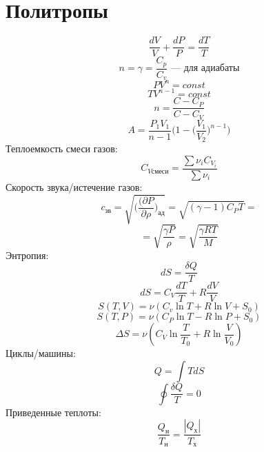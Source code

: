 \documentclass[12pt]{article}
\begin{document}
\twocolumn
\section{Политропы}
\begin{equation*}
\frac{dV}{V} + \frac{dP}{P} = \frac{dT}{T}
\end{equation*}
\begin{equation*}
n = \gamma = \frac{C_p}{C_v} \text{ — для адиабаты}
\end{equation*}
\begin{equation*}
PV^n = const
\end{equation*}
\begin{equation*}
TV^{n-1} = const
\end{equation*}
\begin{equation*}
n = \frac{C - C_P}{C - C_V}
\end{equation*}
\begin{equation*}
A = \frac{P_1V_1}{n - 1} \bigg(1 - \bigg(\frac{V_1}{V_2}\bigg)^{n-1}\bigg)
\end{equation*}
Теплоемкость смеси газов:
\begin{equation*}
C_{Vсмеси} = \frac{\sum \nu_i C_{V_i}}{\sum \nu_i}
\end{equation*}
Скорость звука/истечение газов:
\begin{equation*}
c_{зв} = \sqrt{\bigg(\frac{(\partial P}{\partial \rho}\bigg)_{ад}} = \sqrt{(\gamma - 1)C_P T} = 
\end{equation*}
\begin{equation*}
= \sqrt{\frac{\gamma P}{\rho}}= \sqrt{\frac{\gamma RT}{M}}
\end{equation*}
Энтропия:
\begin{equation*}
dS = \frac{\delta Q}{T}
\end{equation*}
\begin{equation*}
dS = C_V \frac{dT}{T} + R\frac{dV}{V}
\end{equation*}
\begin{equation*}
S(T, V) = \nu(C_v \ln T + R\ln V + S_0)
\end{equation*}
\begin{equation*}
S(T, P) = \nu(C_P \ln T - R\ln P + S_0)
\end{equation*}
\begin{equation*}
\Delta S = \nu(C_V \ln \frac{T}{T_0} + R \ln \frac{V}{V_0})
\end{equation*}
Циклы/машины:
\begin{equation*}
Q = \int TdS
\end{equation*}
\begin{equation*}
\oint \frac{\delta Q}{T} = 0
\end{equation*}
Приведенные теплоты:
\begin{equation*}
\frac{Q_н}{T_н} = \frac{|Q_х|}{T_х}
\end{equation*}
\end{document}
